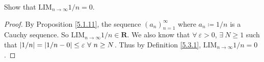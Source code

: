 \begin{exercise}\label{ex 5.3.5}
    Show that \(\text{LIM}_{n \to \infty} 1 / n = 0\).
\end{exercise}

\begin{proof}
    By Proposition \ref{5.1.11}, the sequence \((a_n)_{n = 1}^{\infty}\) where \(a_n \coloneqq 1 / n\) is a Cauchy sequence.
    So \(\text{LIM}_{n \to \infty} 1 / n \in \mathbf{R}\).
    We also know that \(\forall\ \varepsilon > 0\), \(\exists\ N \geq 1\) such that \(\abs*{1 / n} = \abs*{1 / n - 0} \leq \varepsilon \ \forall\ n \geq N\).
    Thus by Definition \ref{5.3.1}, \(\text{LIM}_{n \to \infty} 1 / n = 0\).
\end{proof}